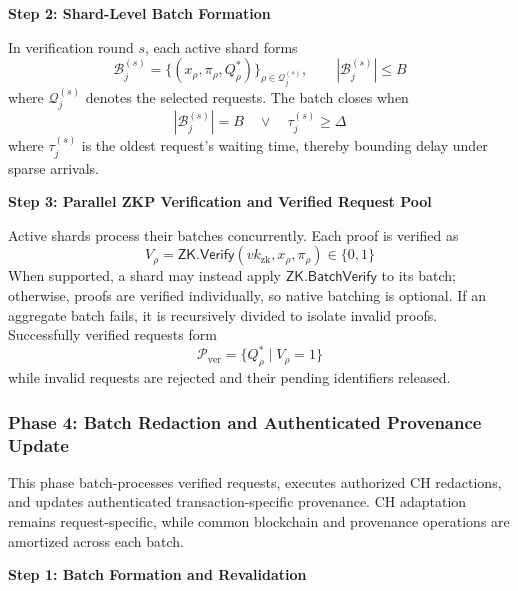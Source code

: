 \documentclass[lettersize,journal]{IEEEtran}
\begin{document}
\smallskip
\noindent\textbf{Step 2: Shard-Level Batch Formation}

In verification round $s$, each active shard forms
\begin{equation}
\mathcal{B}_j^{(s)}
=
\{(x_\rho,\pi_\rho,Q_\rho^{*})\}_{\rho\in\mathcal{Q}_j^{(s)}},
\qquad
|\mathcal{B}_j^{(s)}|\leq B
\label{eq:proof-batch}
\end{equation}
where $\mathcal{Q}_j^{(s)}$ denotes the selected requests. The batch closes when
\begin{equation}
|\mathcal{B}_j^{(s)}|=B
\quad\lor\quad
\tau_j^{(s)}\geq\Delta
\label{eq:batch-close}
\end{equation}
where $\tau_j^{(s)}$ is the oldest request's waiting time, thereby bounding delay under sparse arrivals.

\smallskip
\smallskip
\noindent\textbf{Step 3: Parallel ZKP Verification and Verified Request Pool}

Active shards process their batches concurrently. Each proof is verified as
\begin{equation}
V_\rho=
\mathsf{ZK.Verify}(vk_{\mathrm{zk}},x_\rho,\pi_\rho)\in\{0,1\}
\label{eq:individual-zk-verification}
\end{equation}
When supported, a shard may instead apply
$\mathsf{ZK.BatchVerify}$ to its batch; otherwise, proofs are verified
individually, so native batching is optional. If an aggregate batch fails,
it is recursively divided to isolate invalid proofs. Successfully verified
requests form
\begin{equation}
\mathcal{P}_{\mathrm{ver}}
=
\{Q_\rho^{*}\mid V_\rho=1\}
\label{eq:verified-pool}
\end{equation}
while invalid requests are rejected and their pending identifiers released.
\medskip

\subsubsection*{\textbf{Phase 4: Batch Redaction and Authenticated Provenance Update}}

This phase batch-processes verified requests, executes authorized CH
redactions, and updates authenticated transaction-specific provenance.
CH adaptation remains request-specific, while common blockchain and
provenance operations are amortized across each batch.

\smallskip
\noindent\textbf{Step 1: Batch Formation and Revalidation}
\end{document}
